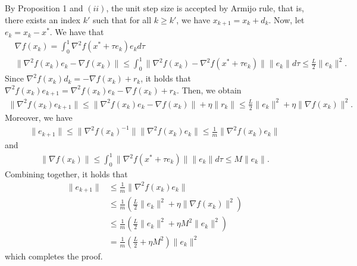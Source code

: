 \documentclass{ExerciseSheet}
\begin{document}
\begin{solution}
\begin{itemize}
        By Proposition 1 and $(ii)$, the unit step size is accepted by Armijo rule, that is, there exists an index $k'$ such that for all $k\geq k'$, we have $x_{k+1}=x_k +d_k$. Now, let $e_k=x_k-x^*$. We have that
        \begin{align*}
            &\nabla f(x_k)  = \int_0^1 \nabla^2 f(x^*+\tau e_k)e_k d\tau \\
           & \lVert \nabla^2 f(x_k)e_k-\nabla f(x_k)\rVert \leq \int_0^1 \lVert \nabla^2 f(x_k)-\nabla^2 f(x^*+\tau e_k)\rVert \lVert e_k\rVert d\tau \leq \frac{L}{2}\lVert e_k\rVert^2.
        \end{align*}
        Since $\nabla^2 f(x_k)d_k = -\nabla f(x_k)+r_k$, it holds that $\nabla^2 f(x_k) e_{k+1} = \nabla^2 f(x_k) e_{k}-\nabla f(x_k)+r_k.$ Then, we obtain
        \begin{align*}
            \lVert \nabla^2 f(x_k) e_{k+1} \rVert \leq \lVert \nabla^2 f(x_k) e_{k}-\nabla f(x_k)\rVert + \eta \lVert r_k\rVert \leq \frac{L}{2}\lVert e_k\rVert^2+\eta \lVert \nabla f(x_k)\rVert^2.
        \end{align*}
        Moreover, we have
        \begin{align*}
            \lVert e_{k+1}\rVert \leq \lVert \nabla^2 f(x_k)^{-1}\rVert \lVert \nabla^2 f(x_k)e_k\rVert\leq \frac{1}{m}\lVert \nabla^2 f(x_k)e_k\rVert
        \end{align*}
        and 
        \begin{align*}
            \lVert \nabla f(x_k)\rVert \leq \int_0^1 \lVert \nabla^2 f(x^*+\tau e_k)\rVert\lVert e_k\rVert d\tau \leq M \lVert e_k\rVert.
        \end{align*}
        Combining together, it holds that
        \begin{align*}
            \lVert e_{k+1}\rVert &\leq \frac{1}{m}\lVert \nabla^2 f(x_k)e_k\rVert\\
            &\leq \frac{1}{m}\left(\frac{L}{2}\lVert e_k\rVert^2+\eta \lVert \nabla f(x_k)\rVert^2\right)\\
            &\leq \frac{1}{m}\left(\frac{L}{2}\lVert e_k\rVert^2+\eta M^2 \lVert e_k\rVert^2\right) \\
            &= \frac{1}{m}\left(\frac{L}{2}+\eta M^2\right)\lVert e_k\rVert^2
        \end{align*}
        which completes the proof.
    \end{itemize}
\end{solution}

\fi
\end{document}
